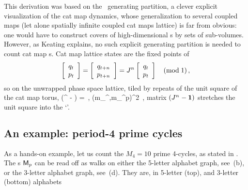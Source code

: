 This derivation was based on the \AW\ generating partition, a clever
explicit visualization of the cat map dynamics, whose generalization to
several coupled maps (let alone spatially infinite coupled cat
maps lattice) is far from obvious: one would have to construct covers of
high-dimensional {\fundPip}s by sets of sub-volumes.
However, as Keating explains, no such explicit generating
partition is needed to count cat map \po s.
Cat map  lattice states are the fixed points of
\[
\left[\begin{array}{c}
  q_{t}  \\ p_{t}
  \end{array}\right]
=
   \left[\begin{array}{c}
  q_{t+{n_{}}}  \\ p_{t+{n_{}}}
  \end{array}\right]
=
  J^{n_{}}
  \left[\begin{array}{c}
  q_{t}  \\ p_{t}
  \end{array}\right]
  \quad (\mbox{mod}\;1)
\,,
\]
so on the unwrapped phase space lattice, tiled by repeats of the
unit square of the cat map torus,
\beq
 (\jMps^\cl{} - \matId)
=
\,,\qquad
    (m_{\zeit}^\coord,m_{\zeit}^p)\in\integers^2
\,,
matrix $(J^{n_{}} - {\bf 1})$ stretches the unit square into
the `{\fundPip}'.

\subsection{An example: period-4 prime cycles}
\label{s:cat4cycles}

As a hands-on example, let us count the $M_4=10$ {\admissible} prime
4-cycles, as stated in .
The {\admissible} \brick s $\mathsf{M}_p$ can be read off as walks on
either the 5-letter alphabet  graph, see
\,(b),
or the 3-letter alphabet  graph, see
\,(d). They are, in 5-letter (top), and
3-letter (bottom) alphabets

